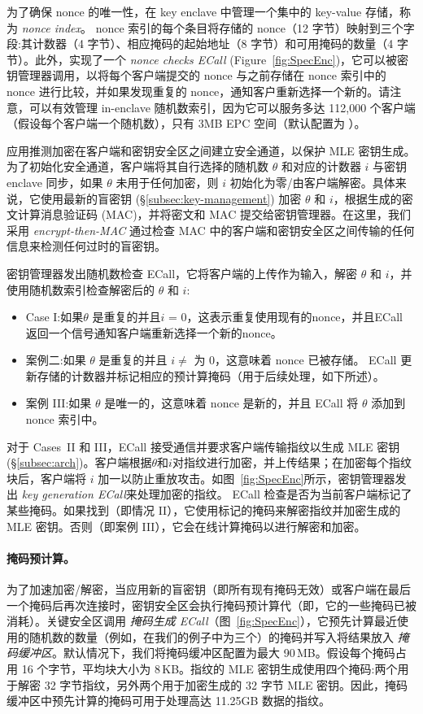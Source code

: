 为了确保 nonce 的唯一性，\sysname 在 key enclave 中管理一个集中的 key-value 存储，称为 \textit{ nonce index}。 nonce 索引的每个条目将存储的 nonce（12 字节）映射到三个字段:其计数器（4 字节）、相应掩码的起始地址（8 字节）和可用掩码的数量（4 字节）。此外，\sysname 实现了一个 \textit{ nonce checks ECall} (Figure~\ref{fig:SpecEnc})，它可以被密钥管理器调用，以将每个客户端提交的 nonce 与之前存储在 nonce 索引中的 nonce 进行比较，并如果发现重复的 nonce，通知客户重新选择一个新的。请注意，可以有效管理 in-enclave 随机数索引，因为它可以服务多达 112,000 个客户端（假设每个客户端一个随机数），只有 3MB EPC 空间（默认配置为 \sysname）。

\sysname 应用推测加密在客户端和密钥安全区之间建立安全通道，以保护 MLE 密钥生成。为了初始化安全通道，客户端将其自行选择的随机数 $\theta$ 和对应的计数器 $i$ 与密钥 enclave 同步，如果 $\theta$ 未用于任何加密，则 $i$ 初始化为零/由客户端解密。具体来说，它使用最新的盲密钥 (\S\ref{subsec:key-management}) 加密 $\theta$ 和 $i$，根据生成的密文计算消息验证码 (MAC)，并将密文和 MAC 提交给密钥管理器。在这里，我们采用 \textit{ encrypt-then-MAC} \cite{bellare00} 通过检查 MAC 中的客户端和密钥安全区之间传输的任何信息来检测任何过时的盲密钥。

密钥管理器发出随机数检查 ECall，它将客户端的上传作为输入，解密 $\theta$ 和 $i$，并使用随机数索引检查解密后的 $\theta$ 和 $i$:
%
\begin{itemize}[leftmargin=*]
\item Case I:如果$\theta$ 是重复的并且$i$ = 0，这表示重复使用现有的nonce，并且ECall 返回一个信号通知客户端重新选择一个新的nonce。
\item 案例二:如果 $\theta$ 是重复的并且 $i \neq$ 为 0，这意味着 nonce 已被存储。 ECall 更新存储的计数器并标记相应的预计算掩码（用于后续处理，如下所述）。
\item 案例 III:如果 $\theta$ 是唯一的，这意味着 nonce 是新的，并且 ECall 将 $\theta$ 添加到 nonce 索引中。
\end{itemize}

对于 Cases~II 和 III，ECall 接受通信并要求客户端传输指纹以生成 MLE 密钥 (\S\ref{subsec:arch})。客户端根据$\theta$和$i$对指纹进行加密，并上​​传结果；在加密每个指纹块后，客户端将 $i$ 加一以防止重放攻击。如图~\ref{fig:SpecEnc}所示，密钥管理器发出\textit{ key generation ECall}来处理加密的指纹。 ECall 检查是否为当前客户端标记了某些掩码。如果找到（即情况 II），它使用标记的掩码来解密指纹并加密生成的 MLE 密钥。否则（即案例 III），它会在线计算掩码以进行解密和加密。

\paragraph{掩码预计算。} 为了加速加密/解密，当应用新的盲密钥（即所有现有掩码无效）或客户端在最后一个掩码后再次连接时，密钥安全区会执行掩码预计算代（即，它的一些掩码已被消耗）。关键安全区调用 \textit{ 掩码生成 ECall}（图~\ref{fig:SpecEnc}），它预先计算最近使用的随机数的数量（例如，在我们的例子中为三个）的掩码并写入将结果放入 \textit{ 掩码缓冲区}。默认情况下，我们将掩码缓冲区配置为最大 90\,MB。假设每个掩码占用 16 个字节，平均块大小为 8\,KB。指纹的 MLE 密钥生成使用四个掩码:两个用于解密 32 字节指纹，另外两个用于加密生成的 32 字节 MLE 密钥。因此，掩码缓冲区中预先计算的掩码可用于处理高达 11.25GB 数据的指纹。
